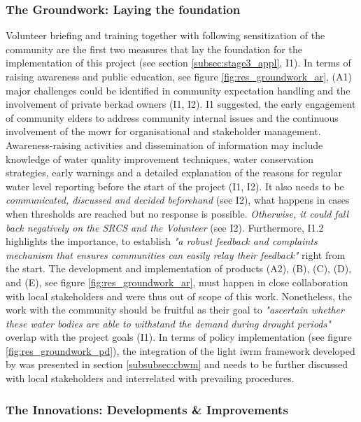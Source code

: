 \subsubsection*{The Groundwork: Laying the foundation}\label{subsubsec:groundwork_appl}

Volunteer briefing and training together with following sensitization of the community are the first two measures that lay the foundation for the implementation of this project (see section \ref{subsec:stage3_appl}, I1). In terms of raising awareness and public education, see figure \ref{fig:res_groundwork_ar}, (A1) major challenges could be identified in community expectation handling and the involvement of private berkad owners (I1, I2). I1 suggested, the early engagement of community elders to address community internal issues and the continuous involvement of the \acrshort{mowr} for organisational and stakeholder management. Awareness-raising activities and dissemination of information may include knowledge of water quality improvement techniques, water conservation strategies, early warnings and a detailed explanation of the reasons for regular water level reporting before the start of the project (I1, I2). It also needs to be \textit{communicated, discussed and decided beforehand} (see I2), what happens in cases when thresholds are reached but no response is possible. \textit{Otherwise, it could fall back negatively on the SRCS and the Volunteer} (see I2). Furthermore, I1.2 highlights the importance, to establish \textit{"a robust feedback and complaints mechanism that ensures communities can easily relay their feedback"} right from the start. The development and implementation of products (A2), (B), (C), (D), and (E), see figure \ref{fig:res_groundwork_ar}, must happen in close collaboration with local stakeholders and were thus out of scope of this work. Nonetheless, the work with the community should be fruitful as their goal to \textit{"ascertain whether these water bodies are able to withstand the demand during drought periods"} overlap with the project goals (I1).\newline
In terms of policy implementation (see figure \ref{fig:res_groundwork_pd}), the integration of the light \acrshort{iwrm} framework developed by \textcite{dayCommunitybasedWaterResources2009} was presented in section \ref{subsubsec:cbwm} and needs to be further discussed with local stakeholders and interrelated with prevailing procedures.

\subsubsection*{The Innovations: Developments \& Improvements}\label{subsubsec:innovations_appl}

